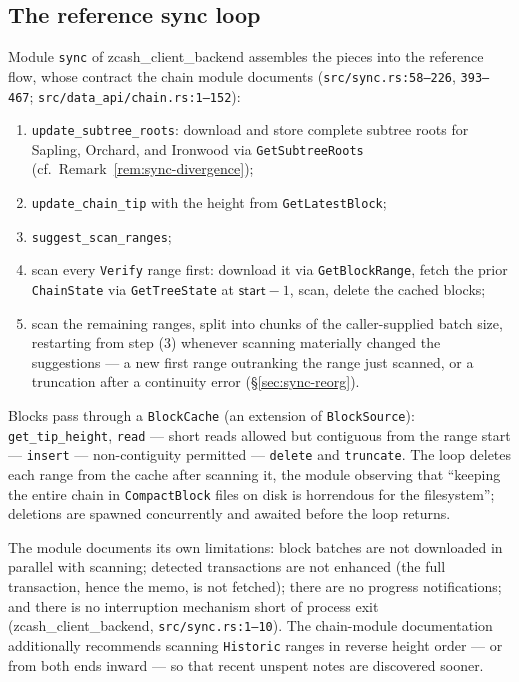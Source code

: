 \documentclass[11pt,a4paper]{article}
\theoremstyle{definition}
\begin{document}
\subsection{The reference sync loop}\label{sec:sync-loop}

Module \texttt{sync} of \textsf{zcash\_client\_backend} assembles the
pieces into the reference flow, whose contract the chain module documents
(\texttt{src/sync.rs:58--226}, \texttt{393--467};
\texttt{src/data\_api/}\allowbreak\texttt{chain.rs:1--152}):
\begin{enumerate}[label=(\arabic*)]
\item[(1--2)] \texttt{update\_subtree\_roots}: download and store complete
  subtree roots for Sapling, Orchard, and Ironwood via
  \texttt{GetSubtreeRoots} (cf.\ Remark~\ref{rem:sync-divergence});
\item[(3--4)] \texttt{update\_chain\_tip} with the height from
  \texttt{GetLatestBlock};
\item[(5)] \texttt{suggest\_scan\_ranges};
\item[(6)] scan every \texttt{Verify} range first: download it via
  \texttt{GetBlockRange}, fetch the prior \texttt{ChainState} via
  \texttt{GetTreeState} at $\mathsf{start} - 1$, scan, delete the cached
  blocks;
\item[(7)] scan the remaining ranges, split into chunks of the
  caller-supplied batch size, restarting from step (3) whenever scanning
  materially changed the suggestions --- a new first range outranking the
  range just scanned, or a truncation after a continuity error
  (\S\ref{sec:sync-reorg}).
\end{enumerate}

Blocks pass through a \texttt{BlockCache} (an extension of
\texttt{BlockSource}): \texttt{get\_tip\_height}, \texttt{read} --- short
reads allowed but contiguous from the range start --- \texttt{insert} ---
non-contiguity permitted --- \texttt{delete} and \texttt{truncate}. The
loop deletes each range from the cache after scanning it, the module
observing that ``keeping the entire chain in \texttt{CompactBlock} files on
disk is horrendous for the filesystem''; deletions are spawned concurrently
and awaited before the loop returns.

The module documents its own limitations: block batches are not downloaded
in parallel with scanning; detected transactions are not enhanced (the full
transaction, hence the memo, is not fetched); there are no progress
notifications; and there is no interruption mechanism short of process
exit (\textsf{zcash\_client\_backend}, \texttt{src/sync.rs:1--10}). The
chain-module
documentation additionally recommends scanning \texttt{Historic} ranges in
reverse height order --- or from both ends inward --- so that recent
unspent notes are discovered sooner.
\end{document}
